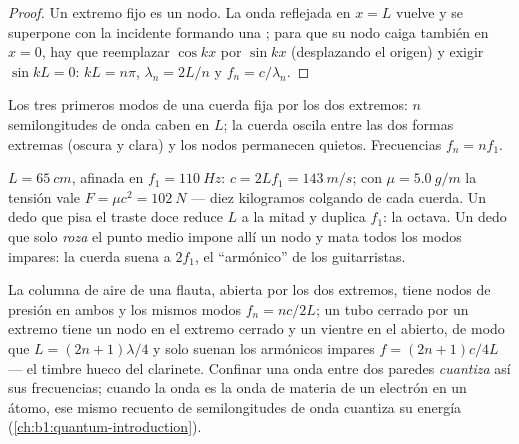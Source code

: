 \begin{proof}
Un extremo fijo es un nodo. La onda reflejada en $x = L$ vuelve y se
superpone con la incidente formando una ; para que su
nodo caiga también en $x = 0$, hay que reemplazar $\cos kx$ por $\sin kx$
(desplazando el origen) y exigir $\sin kL = 0$: $kL = n\pi$,
$\lambda_n = 2L/n$ y $f_n = c/\lambda_n$.
\end{proof}

\begin{omfigure}

{\small Los tres primeros modos de una cuerda fija por los dos extremos:
$n$ semilongitudes de onda caben en $L$; la cuerda oscila entre las dos
formas extremas (oscura y clara) y los nodos permanecen quietos.
Frecuencias $f_n = nf_1$.}
\end{omfigure}

\begin{example}\label{ex:b1:wave-propagation:guitar}
$L = \qty{65}{cm}$, afinada en $f_1 = \qty{110}{Hz}$: $c = 2Lf_1 =
\qty{143}{m/s}$; con $\mu = \qty{5.0}{g/m}$ la tensión vale $F = \mu c^2
= \qty{102}{N}$ --- diez kilogramos colgando de cada cuerda. Un dedo que
pisa el traste doce reduce $L$ a la mitad y duplica $f_1$: la octava. Un
dedo que solo \emph{roza} el punto medio impone allí un nodo y mata todos
los modos impares: la cuerda suena a $2f_1$, el ``armónico'' de los
guitarristas.
\end{example}

\begin{remark}\label{rem:b1:wave-propagation:pipes}
La columna de aire de una flauta, abierta por los dos extremos, tiene
nodos de presión en ambos y los mismos modos $f_n = nc/2L$; un tubo
cerrado por un extremo tiene un nodo en el extremo cerrado y un vientre en
el abierto, de modo que $L = (2n + 1)\lambda/4$ y solo suenan los
armónicos impares $f = (2n + 1)c/4L$ --- el timbre hueco del clarinete.
Confinar una onda entre dos paredes \emph{cuantiza} así sus frecuencias;
cuando la onda es la onda de materia de un electrón en un átomo, ese mismo
recuento de semilongitudes de onda cuantiza su energía
(\cref{ch:b1:quantum-introduction}).
\end{remark}

